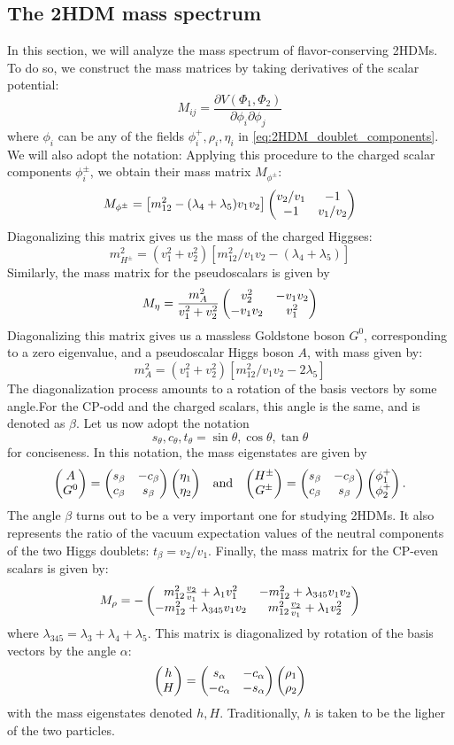 \subsection{The 2HDM mass spectrum}

In this section, we will analyze the mass spectrum of flavor-conserving 2HDMs. To do so, we construct the mass matrices by taking derivatives of the scalar potential:
\[M_{ij} = \frac{\partial V(\Phi_1,\Phi_2)}{\partial\phi_i\partial\phi_j}\]
where $\phi_{i}$ can be any of the fields $\phi_i^+,\rho_i,\eta_i$ in \autoref{eq:2HDM_doublet_components}. We will also adopt the notation: 
Applying this procedure to the charged scalar components $\phi_i^\pm$, we obtain their mass matrix $M_{\phi^{\pm}}$:
\[M_{\phi^\pm} = \left[m_{12}^2-(\lambda_4+\lambda_5)v_1v_2\right]\begin{pmatrix} v_2/v_1 & -1 \\ -1 & v_1/v_2\end{pmatrix}\]
Diagonalizing this matrix gives us the mass of the charged Higgses:
\[m_{H^\pm}^2 = (v_1^2+v_2^2)[m_{12}^2/v_1v_2-(\lambda_4+\lambda_5)]\]
Similarly, the mass matrix for the pseudoscalars is given by
\[M_{\eta} = \frac{m_A^2}{v_1^2+v_2^2}\begin{pmatrix} v_2^2 & -v_1v_2 \\ -v_1v_2 & v_1^2\end{pmatrix}\]
Diagonalizing this matrix gives us a massless Goldstone boson $G^0$, corresponding to a zero eigenvalue, and a pseudoscalar Higgs boson $A$, with mass given by:
\[m_A^2 = (v_1^2+v_2^2)[m_{12}^2/v_1v_2-2\lambda_5]\]
The diagonalization process amounts to a rotation of the basis vectors by some angle.For the CP-odd and the charged scalars, this angle is the same, and is denoted as $\beta$. Let us now adopt the notation 
\[s_\theta,c_\theta,t_\theta = \sin\theta,\cos\theta,\tan\theta\]
for conciseness. In this notation, the mass eigenstates are given by
\begin{align}
\begin{pmatrix} A \\ G^0\end{pmatrix} = \begin{pmatrix} s_\beta & -c_\beta \\ c_\beta & s_\beta\end{pmatrix}\begin{pmatrix} \eta_1 \\ \eta_2\end{pmatrix}&&\text{and}&&
\begin{pmatrix} H^\pm \\ G^\pm\end{pmatrix} = \begin{pmatrix} s_\beta & -c_\beta \\ c_\beta & s_\beta\end{pmatrix}\begin{pmatrix} \phi_1^+ \\ \phi_2^+\end{pmatrix}.
\end{align}
The angle $\beta$ turns out to be a very important one for studying 2HDMs. It also represents the ratio of the vacuum expectation values of the neutral components of the two Higgs doublets: $t_\beta = v_2/v_1$.
Finally, the mass matrix for the CP-even scalars is given by:
\[M_{\rho} = -\begin{pmatrix} m_{12}^2\frac{v_2}{v_1}+\lambda_1v_1^2 & -m_{12}^2+\lambda_{345}v_1v_2 \\ -m_{12}^2+\lambda_{345}v_1v_2 & m_{12}^2\frac{v_2}{v_1}+\lambda_1v_2^2\end{pmatrix}\]
where $\lambda_{345} = \lambda_3+\lambda_4+\lambda_5$. This matrix is diagonalized by rotation of the basis vectors by the angle $\alpha$:
\[\begin{pmatrix} h \\ H\end{pmatrix} = \begin{pmatrix} s_\alpha & -c_\alpha \\ -c_\alpha & -s_\alpha\end{pmatrix}\begin{pmatrix} \rho_1 \\ \rho_2\end{pmatrix}\]
with the mass eigenstates denoted $h,H$. Traditionally, $h$ is taken to be the ligher of the two particles. 

